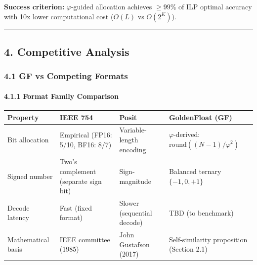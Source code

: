 \textbf{Success criterion:} \(\varphi\)-guided allocation achieves
\(\geq 99\%\) of ILP optimal accuracy with 10x lower computational cost
(\(O(L)\) vs \(O(2^K)\)).

\begin{center}\rule{0.5\linewidth}{0.5pt}\end{center}

\subsection{4. Competitive Analysis}\label{competitive-analysis}

\subsubsection{4.1 GF vs Competing
Formats}\label{gf-vs-competing-formats}

\paragraph{4.1.1 Format Family
Comparison}\label{format-family-comparison}

{\def\LTcaptype{none} %
\begin{longtable}[]{@{}
  >{\raggedright\arraybackslash}p{}
  >{\raggedright\arraybackslash}p{}
  >{\raggedright\arraybackslash}p{}
  >{\raggedright\arraybackslash}p{}@{}}
\toprule\noalign{}
\begin{minipage}[b]{\linewidth}\raggedright
Property
\end{minipage} & \begin{minipage}[b]{\linewidth}\raggedright
IEEE 754
\end{minipage} & \begin{minipage}[b]{\linewidth}\raggedright
Posit
\end{minipage} & \begin{minipage}[b]{\linewidth}\raggedright
GoldenFloat (GF)
\end{minipage} \\
\midrule\noalign{}
\endhead
\bottomrule\noalign{}
\endlastfoot
Bit allocation & Empirical (FP16: 5/10, BF16: 8/7) & Variable-length
encoding & \(\varphi\)-derived: \(\text{round}((N-1)/\varphi^2)\) \\
Signed number & Two's complement (separate sign bit) & Sign-magnitude &
Balanced ternary \(\{-1, 0, +1\}\) \\
Decode latency & Fast (fixed format) & Slower (sequential decode) & TBD
(to benchmark) \\
Mathematical basis & IEEE committee (1985) & John Gustafson (2017) &
Self-similarity proposition (Section 2.1) \\
\end{longtable}
}

